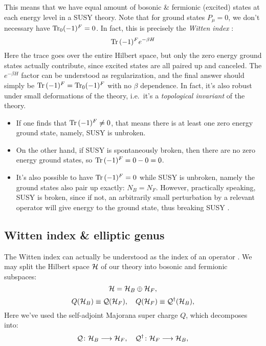 \documentclass[a4paper
	,10pt
]{article}
\begin{document}
	This means that we have equal amount of bosonic \& fermionic (excited) states at each energy level in a SUSY theory. 
	Note that for ground states $P_\mu = 0$, we don't necessary have $\Tr_0 (-1)^F = 0$. In fact, this is precisely the \textit{Witten index} \cite{Witten:1982df}:
	\begin{equation}
		\Tr\,(-1)^F e^{-\beta H}
	\end{equation}
	Here the trace goes over the entire Hilbert space, but only the zero energy ground states actually contribute, since excited states are all paired up and canceled. The $e^{-\beta H}$ factor can be understood as regularization, and the final answer should simply be $\Tr\,(-1)^F = \Tr_0 (-1)^F$ with no $\beta$ dependence. In fact, it's also robust under small deformations of the theory, i.e.\ it's a \textit{topological invariant} of the theory. 
	
	\begin{itemize}
	\item If one finds that $\Tr\,(-1)^F \ne 0$, that means there is at least one zero energy ground state, namely, SUSY is unbroken. 
	
	\item On the other hand, if SUSY is spontaneously broken, then there are no zero energy ground states, so $\Tr\,(-1)^F = 0 - 0 = 0$. 
	
	\item It's also possible to have $\Tr\,(-1)^F = 0$ while SUSY is unbroken, namely the ground states also pair up exactly: $N_B = N_F$. However, practically speaking, SUSY is broken, since if not, an arbitrarily small perturbation by a relevant operator will give energy to the ground state, thus breaking SUSY \cite{Argyres:1996abc}. 
	\end{itemize}
	
\subsection{Witten index \& elliptic genus}
	
	The Witten index can actually be understood as the index of an operator \cite{Witten:1982df}. We may split the Hilbert space $\mathcal{H}$ of our theory into bosonic and fermionic subspaces:
	\begin{equation}
		\mathcal{H} = \mathcal{H}_B \oplus \mathcal{H}_F,
	\end{equation}
	\vspace{-\baselineskip}
	\begin{equation}
		Q(\mathcal{H}_B) \equiv \mathcal{Q(}\mathcal{H}_F),
	\quad
		Q(\mathcal{H}_F) \equiv \mathcal{Q}^\dagger(\mathcal{H}_B),
	\end{equation}
	Here we've used the self-adjoint Majorana super charge $Q$, which decomposes into:
	\begin{equation}
		\mathcal{Q}\colon \mathcal{H}_B \longrightarrow \mathcal{H}_F,
	\quad
		\mathcal{Q}^\dagger\colon \mathcal{H}_F \longrightarrow \mathcal{H}_B,
	\end{equation}
	
\end{document}
